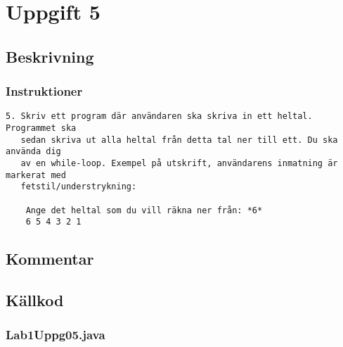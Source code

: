 \section{Uppgift 5}\label{uppgift-5}

\subsection{Beskrivning}
\subsubsection*{Instruktioner}
\begin{verbatim}
5. Skriv ett program där användaren ska skriva in ett heltal. Programmet ska
   sedan skriva ut alla heltal från detta tal ner till ett. Du ska använda dig
   av en while-loop. Exempel på utskrift, användarens inmatning är markerat med
   fetstil/understrykning:

    Ange det heltal som du vill räkna ner från: *6*
    6 5 4 3 2 1
\end{verbatim}

\subsection{Kommentar}

\subsection{Källkod}\label{uppgift-5_src}
\subsubsection*{Lab1Uppg05.java}
\inputminted[]{java}{src/Lab1Uppg05.java}
